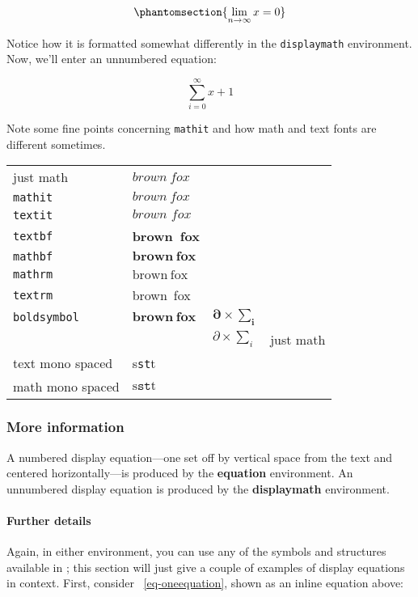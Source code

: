 \begin{equation}\phantomsection{
\lim_{n\rightarrow \infty}x=0
}\label{eq-oneequation}\end{equation}

Notice how it is formatted somewhat differently in the
\texttt{displaymath} environment. Now, we'll enter an unnumbered
equation:

\[\sum_{i=0}^{\infty} x + 1\]

Note some fine points concerning \texttt{mathit} and
how math and text fonts are different sometimes.

\begin{center}
  \begin{tabular}[c]{|l|l|l|l|}
    just math & $brown~fox$ \\
    \texttt{mathit} & $\mathit{brown~fox}$ \\
    \texttt{textit} & $\textit{brown~fox}$ \\
    \texttt{textbf}& \textbf{brown~fox} \\
    \texttt{mathbf}& $\mathbf{brown~fox}$ \\
    \texttt{mathrm}& $\mathrm{brown~fox}$ \\
    \texttt{textrm}& \textrm{brown~fox} \\
    \texttt{boldsymbol}& $\boldsymbol{brown~fox}$ & $\boldsymbol{\partial\times\sum_i}$\\
              && $\partial\times\sum_i$&just math \\
    text mono spaced& s\texttt{st}t &\\
    math mono spaced& $\mathrm{s}\mathtt{st}\mathrm{t}$&
  \end{tabular}
\end{center}

\subsubsection{More information}

A numbered display equation---one set off by vertical space from the
text and centered horizontally---is produced by the \textbf{equation}
environment. An unnumbered display equation is produced by the
\textbf{displaymath} environment.

\paragraph{Further details}

Again, in either environment, you can use any of the symbols and
structures available in \LaTeX@; this section will just give a couple of
examples of display equations in context. First, consider
~\eqref{eq-oneequation}, shown as an inline equation above:


